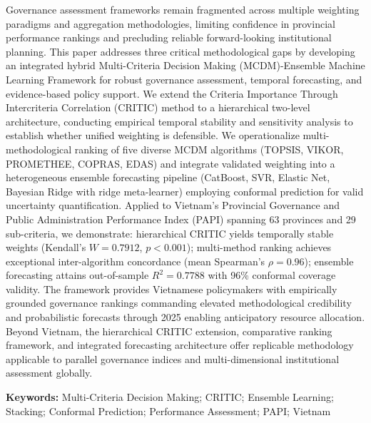 \documentclass[12pt,a4paper]{article}
\begin{document}
\begin{titlepage}
  {\footnotesize
  \begin{justify}
  Governance assessment frameworks remain fragmented across multiple weighting paradigms and aggregation methodologies, limiting confidence in provincial performance rankings and precluding reliable forward-looking institutional planning. This paper addresses three critical methodological gaps by developing an integrated hybrid Multi-Criteria Decision Making (MCDM)-Ensemble Machine Learning Framework for robust governance assessment, temporal forecasting, and evidence-based policy support. We extend the Criteria Importance Through Intercriteria Correlation (CRITIC) method to a hierarchical two-level architecture, conducting empirical temporal stability and sensitivity analysis to establish whether unified weighting is defensible. We operationalize multi-methodological ranking of five diverse MCDM algorithms (TOPSIS, VIKOR, PROMETHEE, COPRAS, EDAS) and integrate validated weighting into a heterogeneous ensemble forecasting pipeline (CatBoost, SVR, Elastic Net, Bayesian Ridge with ridge meta-learner) employing conformal prediction for valid uncertainty quantification. Applied to Vietnam's Provincial Governance and Public Administration Performance Index (PAPI) spanning 63 provinces and 29 sub-criteria, we demonstrate: hierarchical CRITIC yields temporally stable weights (Kendall's $W = 0.7912$, $p < 0.001$); multi-method ranking achieves exceptional inter-algorithm concordance (mean Spearman's $\rho = 0.96$); ensemble forecasting attains out-of-sample $R^2 = 0.7788$ with 96\% conformal coverage validity. The framework provides Vietnamese policymakers with empirically grounded governance rankings commanding elevated methodological credibility and probabilistic forecasts through 2025 enabling anticipatory resource allocation. Beyond Vietnam, the hierarchical CRITIC extension, comparative ranking framework, and integrated forecasting architecture offer replicable methodology applicable to parallel governance indices and multi-dimensional institutional assessment globally.
  \end{justify}
  }

  \vspace{0.5cm}

  \noindent\textbf{Keywords:} Multi-Criteria Decision Making; CRITIC; Ensemble Learning;
  Stacking; Conformal Prediction; Performance Assessment; PAPI; Vietnam

  \vspace{0.5cm}
\end{titlepage}
\end{document}
